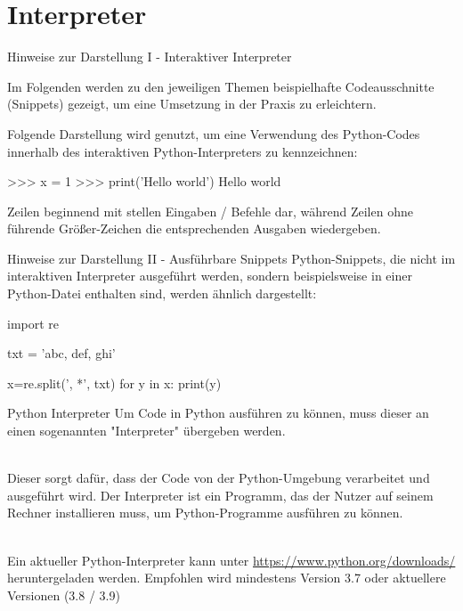  
\section{Interpreter}

    \begin{frame}[fragile]{Hinweise zur Darstellung I - Interaktiver Interpreter}
        
        Im Folgenden werden zu den jeweiligen Themen beispielhafte Codeausschnitte (Snippets) gezeigt, um eine Umsetzung in der Praxis zu erleichtern. 
        
        Folgende Darstellung wird genutzt, um eine Verwendung des Python-Codes innerhalb des interaktiven Python-Interpreters zu kennzeichnen:
\begin{pyconcode}
>>> x = 1
>>> print('Hello world')
Hello world
\end{pyconcode}
    
    Zeilen beginnend mit \code{>>>} stellen Eingaben / Befehle dar, während Zeilen ohne führende Größer-Zeichen die entsprechenden Ausgaben wiedergeben.
    \end{frame}
    
    \begin{frame}[fragile]{Hinweise zur Darstellung II - Ausführbare Snippets}
        Python-Snippets, die nicht im interaktiven Interpreter ausgeführt werden, sondern beispielsweise in einer Python-Datei enthalten sind, werden ähnlich dargestellt:
        
\begin{pythoncode}
import re

txt = 'abc, def, ghi'

x=re.split(', *', txt)
for y in x:
    print(y)

\end{pythoncode}   
        
    \end{frame}
    
    
    \begin{frame}{Python Interpreter}
        Um Code in Python ausführen zu können, muss dieser an einen sogenannten "Interpreter" übergeben werden. \\~\
        
        Dieser sorgt dafür, dass der Code von der Python-Umgebung verarbeitet und ausgeführt wird. Der Interpreter ist ein Programm, das der Nutzer auf seinem Rechner installieren muss, um Python-Programme ausführen zu können. \\~\
        
        Ein aktueller Python-Interpreter kann unter \href{https://www.python.org/downloads/}{https://www.python.org/downloads/} heruntergeladen werden. Empfohlen wird mindestens Version 3.7 oder aktuellere Versionen (3.8 / 3.9)
    \end{frame}
    
